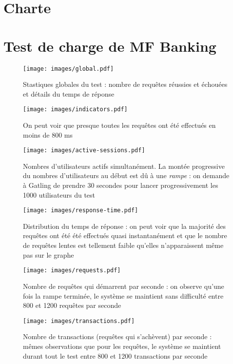 \appendix

\chapter{Charte \excilys{}}
\label{ann:charte}


\chapter{Test de charge de MF Banking}
\label{ann:gatling}
\begin{figure}[h!]
	\centering
		\texttt{[image: images/global.pdf]}
	\caption{Stastiques globales du test : nombre de requêtes réussies et échouées et détails du temps de réponse}
\end{figure}

\begin{figure}[h!]
	\centering
		\texttt{[image: images/indicators.pdf]}
	\caption{On peut voir que presque toutes les requêtes ont été effectués en moins de 800 ms}
\end{figure}

\begin{figure}[h!]
	\centering
		\texttt{[image: images/active-sessions.pdf]}
	\caption{Nombres d'utilisateurs actifs simultanément. La montée progressive du nombres d'utilisateurs au début est dû à une \textit{rampe} : on demande à Gatling de prendre 30 secondes pour lancer progressivement les 1000 utilisateurs du test}
\end{figure}

\begin{figure}[h!]
	\centering
		\texttt{[image: images/response-time.pdf]}
	\caption{Distribution du temps de réponse : on peut voir que la majorité des requêtes ont été été effectués quasi instantanément et que le nombre de requêtes lentes est tellement faible qu'elles n'apparaissent même pas sur le graphe}
\end{figure}

\begin{figure}[h!]
	\centering
		\texttt{[image: images/requests.pdf]}
	\caption{Nombre de requêtes qui démarrent par seconde : on observe qu'une fois la rampe terminée, le système se maintient sans difficulté entre 800 et 1200 requêtes par seconde}
\end{figure}

\begin{figure}[h!]
	\centering
		\texttt{[image: images/transactions.pdf]}
	\caption{Nombre de transactions (requêtes qui s'achèvent) par seconde : mêmes observations que pour les requêtes, le système se maintient durant tout le test entre 800 et 1200 transactions par seconde}
\end{figure}